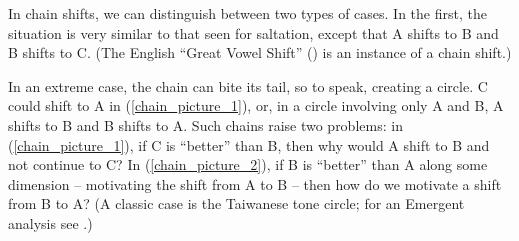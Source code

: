 \begin{example} \label{saltation_picture}\ee
{}
\end{example}


\noindent In chain shifts, we can distinguish between two types of cases. In the first, the situation is very similar to that seen for saltation, except that A shifts to B and B shifts to C. (The English ``Great Vowel Shift'' (\citealt{Chomsky+:1968}) is an instance of a chain shift.)

\begin{example}  \label{chain_picture_1}\ee
{}
\end{example}

\noindent In an extreme case, the chain can bite its tail, so to speak, creating a circle. C could shift to A in (\ref{chain_picture_1}), or, in a circle involving only A and B, A shifts to B and B shifts to A. Such chains raise two problems: in (\ref{chain_picture_1}), if C is ``better'' than B, then why would A shift to B and not continue to C? In (\ref{chain_picture_2}), if B is ``better'' than A along some dimension -- motivating the shift from A to B -- then how do we motivate a shift from B to A? (A classic case  is  the Taiwanese tone circle; for an Emergent analysis see \citealt{Archangeli+:2016mm}.)

\begin{example}  \label{chain_picture_2}\ee
{}
\end{example}

